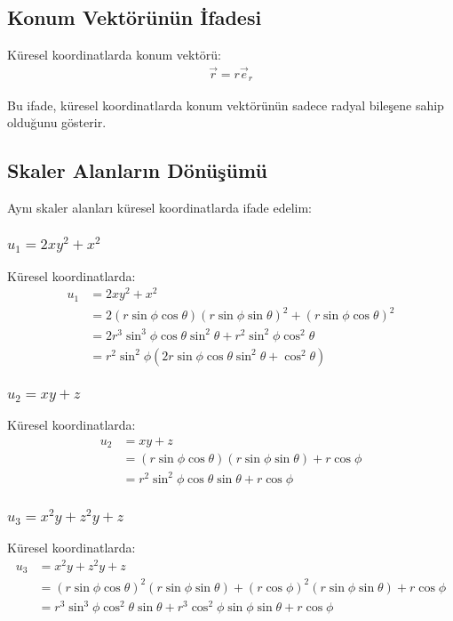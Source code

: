 \documentclass{fenbil}
\begin{document}
\subsection{Konum Vektörünün İfadesi}

Küresel koordinatlarda konum vektörü:
\begin{align}
\vec{r} = r\vec{e}_r
\end{align}

Bu ifade, küresel koordinatlarda konum vektörünün sadece radyal bileşene sahip olduğunu gösterir.

\subsection{Skaler Alanların Dönüşümü}

Aynı skaler alanları küresel koordinatlarda ifade edelim:

\subsubsection{$u_1 = 2xy^2 + x^2$}

Küresel koordinatlarda:
\begin{align}
u_1 &= 2xy^2 + x^2 \\
&= 2(r\sin\phi\cos\theta)(r\sin\phi\sin\theta)^2 + (r\sin\phi\cos\theta)^2 \\
&= 2r^3\sin^3\phi\cos\theta\sin^2\theta + r^2\sin^2\phi\cos^2\theta \\
&= r^2\sin^2\phi(2r\sin\phi\cos\theta\sin^2\theta + \cos^2\theta)
\end{align}

\subsubsection{$u_2 = xy + z$}

Küresel koordinatlarda:
\begin{align}
u_2 &= xy + z \\
&= (r\sin\phi\cos\theta)(r\sin\phi\sin\theta) + r\cos\phi \\
&= r^2\sin^2\phi\cos\theta\sin\theta + r\cos\phi
\end{align}

\subsubsection{$u_3 = x^2y + z^2y + z$}

Küresel koordinatlarda:
\begin{align}
u_3 &= x^2y + z^2y + z \\
&= (r\sin\phi\cos\theta)^2(r\sin\phi\sin\theta) + (r\cos\phi)^2(r\sin\phi\sin\theta) + r\cos\phi \\
&= r^3\sin^3\phi\cos^2\theta\sin\theta + r^3\cos^2\phi\sin\phi\sin\theta + r\cos\phi
\end{align}
\end{document}
